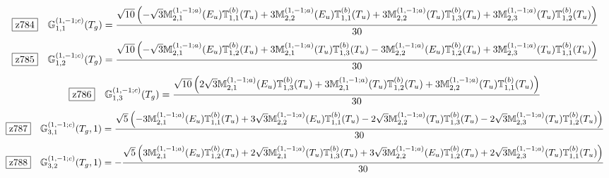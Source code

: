 \documentclass[fleqn,10pt,landscape]{jsarticle}
\begin{document}
\begin{dmath*}
\hspace*{3mm}\fbox{z784}\quad \mathbb{G}_{1,1}^{(1,-1;c)}(T_{g})=\frac{\sqrt{10} \left(- \sqrt{3} \mathbb{M}_{2,1}^{(1,-1;a)}(E_{u}) \mathbb{T}_{1,1}^{(b)}(T_{u}) + 3 \mathbb{M}_{2,2}^{(1,-1;a)}(E_{u}) \mathbb{T}_{1,1}^{(b)}(T_{u}) + 3 \mathbb{M}_{2,2}^{(1,-1;a)}(T_{u}) \mathbb{T}_{1,3}^{(b)}(T_{u}) + 3 \mathbb{M}_{2,3}^{(1,-1;a)}(T_{u}) \mathbb{T}_{1,2}^{(b)}(T_{u})\right)}{30}
\end{dmath*}
\begin{dmath*}
\hspace*{3mm}\fbox{z785}\quad \mathbb{G}_{1,2}^{(1,-1;c)}(T_{g})=\frac{\sqrt{10} \left(- \sqrt{3} \mathbb{M}_{2,1}^{(1,-1;a)}(E_{u}) \mathbb{T}_{1,2}^{(b)}(T_{u}) + 3 \mathbb{M}_{2,1}^{(1,-1;a)}(T_{u}) \mathbb{T}_{1,3}^{(b)}(T_{u}) - 3 \mathbb{M}_{2,2}^{(1,-1;a)}(E_{u}) \mathbb{T}_{1,2}^{(b)}(T_{u}) + 3 \mathbb{M}_{2,3}^{(1,-1;a)}(T_{u}) \mathbb{T}_{1,1}^{(b)}(T_{u})\right)}{30}
\end{dmath*}
\begin{dmath*}
\hspace*{3mm}\fbox{z786}\quad \mathbb{G}_{1,3}^{(1,-1;c)}(T_{g})=\frac{\sqrt{10} \left(2 \sqrt{3} \mathbb{M}_{2,1}^{(1,-1;a)}(E_{u}) \mathbb{T}_{1,3}^{(b)}(T_{u}) + 3 \mathbb{M}_{2,1}^{(1,-1;a)}(T_{u}) \mathbb{T}_{1,2}^{(b)}(T_{u}) + 3 \mathbb{M}_{2,2}^{(1,-1;a)}(T_{u}) \mathbb{T}_{1,1}^{(b)}(T_{u})\right)}{30}
\end{dmath*}
\begin{dmath*}
\hspace*{3mm}\fbox{z787}\quad \mathbb{G}_{3,1}^{(1,-1;c)}(T_{g},1)=\frac{\sqrt{5} \left(- 3 \mathbb{M}_{2,1}^{(1,-1;a)}(E_{u}) \mathbb{T}_{1,1}^{(b)}(T_{u}) + 3 \sqrt{3} \mathbb{M}_{2,2}^{(1,-1;a)}(E_{u}) \mathbb{T}_{1,1}^{(b)}(T_{u}) - 2 \sqrt{3} \mathbb{M}_{2,2}^{(1,-1;a)}(T_{u}) \mathbb{T}_{1,3}^{(b)}(T_{u}) - 2 \sqrt{3} \mathbb{M}_{2,3}^{(1,-1;a)}(T_{u}) \mathbb{T}_{1,2}^{(b)}(T_{u})\right)}{30}
\end{dmath*}
\begin{dmath*}
\hspace*{3mm}\fbox{z788}\quad \mathbb{G}_{3,2}^{(1,-1;c)}(T_{g},1)=- \frac{\sqrt{5} \left(3 \mathbb{M}_{2,1}^{(1,-1;a)}(E_{u}) \mathbb{T}_{1,2}^{(b)}(T_{u}) + 2 \sqrt{3} \mathbb{M}_{2,1}^{(1,-1;a)}(T_{u}) \mathbb{T}_{1,3}^{(b)}(T_{u}) + 3 \sqrt{3} \mathbb{M}_{2,2}^{(1,-1;a)}(E_{u}) \mathbb{T}_{1,2}^{(b)}(T_{u}) + 2 \sqrt{3} \mathbb{M}_{2,3}^{(1,-1;a)}(T_{u}) \mathbb{T}_{1,1}^{(b)}(T_{u})\right)}{30}
\end{dmath*}
\end{document}
